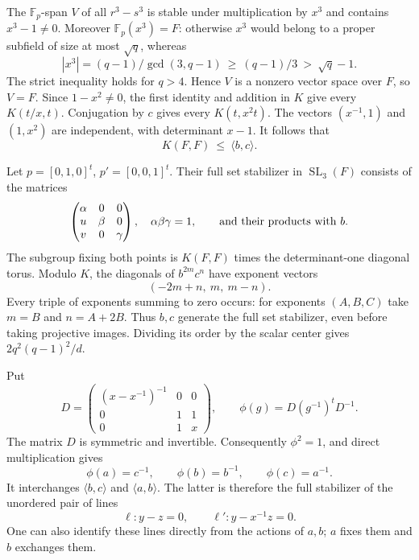 \documentclass[11pt,a4paper]{article}
\newcommand{\SL}{\operatorname{SL}}\newcommand{\PSL}{\operatorname{PSL}}
\begin{document}
The $\mathbb F_p$-span $V$ of all $r^3-s^3$ is stable under
multiplication by $x^3$ and contains $x^3-1\ne0$.
Moreover $\mathbb F_p(x^3)=F$: otherwise $x^3$ would belong to a
proper subfield of size at most $\sqrt q$, whereas
\[
 |x^3|=(q-1)/\gcd(3,q-1)\ \geq\ (q-1)/3\ >\ \sqrt q-1.
\]
The strict inequality holds for $q>4$. Hence $V$ is a nonzero vector
space over $F$, so $V=F$. Since $1-x^2\ne0$, the first identity and
addition in $K$ give every $K(t/x,t)$. Conjugation by $c$ gives every
$K(t,x^2t)$. The vectors $(x^{-1},1)$ and $(1,x^2)$ are independent,
with determinant $x-1$. It follows that
\[
                  K(F,F)\ \leq\ \langle b,c\rangle.
\]

Let $p=[0,1,0]^t$, $p'=[0,0,1]^t$. Their full set stabilizer in
$\SL_3(F)$ consists of the matrices
\[
 \begin{pmatrix}\alpha&0&0\\u&\beta&0\\v&0&\gamma\end{pmatrix},
 \quad \alpha\beta\gamma=1,
 \qquad\hbox{and their products with }b.
\]
The subgroup fixing both points is $K(F,F)$ times the determinant-one
diagonal torus. Modulo $K$, the diagonals of $b^{2m}c^n$ have exponent
vectors
\[
                     (-2m+n,\ m,\ m-n).
\]
Every triple of exponents summing to zero occurs: for exponents
$(A,B,C)$ take $m=B$ and $n=A+2B$. Thus $b,c$ generate the full
set stabilizer, even before taking projective images. Dividing its
order by the scalar center gives $2q^2(q-1)^2/d$.

Put
\[
 D=\begin{pmatrix}(x-x^{-1})^{-1}&0&0\\0&1&1\\0&1&x\end{pmatrix},
 \qquad \phi(g)=D(g^{-1})^tD^{-1}.
\]
The matrix $D$ is symmetric and invertible. Consequently $\phi^2=1$,
and direct multiplication gives
\[
             \phi(a)=c^{-1},\qquad
             \phi(b)=b^{-1},\qquad \phi(c)=a^{-1}.
\]
It interchanges $\langle b,c\rangle$ and $\langle a,b\rangle$.
The latter is therefore the full stabilizer of the unordered pair of
lines
\[
                 \ell:y-z=0,\qquad \ell':y-x^{-1}z=0.
\]
One can also identify these lines directly from the actions of $a,b$;
$a$ fixes them and $b$ exchanges them.
\end{document}
